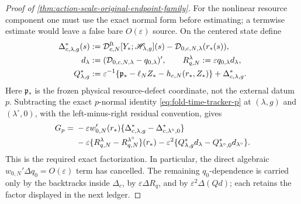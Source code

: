 \begin{proof}[Proof of
\cref{thm:action-scale-original-endpoint-family}]
For the nonlinear resource component one must use the exact normal form
before estimating; a termwise estimate would leave a false bare
\(O(\varepsilon)\) source.  On the centered state define
\begin{align}
 \Delta_{c,\lambda,g}^*(s)
 &:=\mathcal D_{c,N}^{\rm ft}
       [Y_*;\mathscr H_{\lambda,g}](s)
       -\mathcal D_{0,c,N,\lambda}(r_*(s)),\notag\\
 d_\lambda&:=(\mathcal D_{0,c,N,\lambda}
                    -q_{0,\lambda})',\qquad
 R_{q,N}^{\lambda}:=\varepsilon q_{0,\lambda}d_\lambda,\notag\\
 Q_{\lambda,g}^*
 &:=\varepsilon^{-1}
    \{\mathfrak p_*-\ell_NZ_*
                  -h_{c,N}(r_*,Z_*)\}
       +\Delta_{c,\lambda,g}^*.                 \label{eq:proof-oe-family-centered-resource-data}
\end{align}
Here \(\mathfrak p_*\) is the frozen physical resource-defect coordinate,
not the external datum \(p\).  Subtracting the exact \(p\)-normal identity
\cref{eq:fold-time-tracker-p} at
\((\lambda,g)\) and \((\lambda^\circ,0)\), with the left-minus-right
residual convention, gives
\begin{align}
 G_p={}&-\varepsilon w_{0,N}'(r_*)
       \{\Delta_{c,\lambda,g}^*
              -\Delta_{c,\lambda^\circ,0}^*\}\notag\\
 &-\varepsilon
       \{R_{q,N}^{\lambda}-R_{q,N}^{\lambda^\circ}\}(r_*)
 -\varepsilon^2
       \{Q_{\lambda,g}^*d_\lambda
          -Q_{\lambda^\circ,0}^*d_{\lambda^\circ}\}.
                                                        \label{eq:proof-oe-family-resource-exact-factorization}
\end{align}
This is the required exact factorization.  In particular, the direct
algebraic \(w_{0,N}'\Delta q_0=O(\varepsilon)\) term has cancelled.
The remaining \(q_0\)-dependence is carried only by the backtracks inside
\(\Delta_c\), by \(\varepsilon\Delta R_q\), and by
\(\varepsilon^2\Delta(Qd)\); each retains the factor displayed in the
next ledger.


\end{proof}
